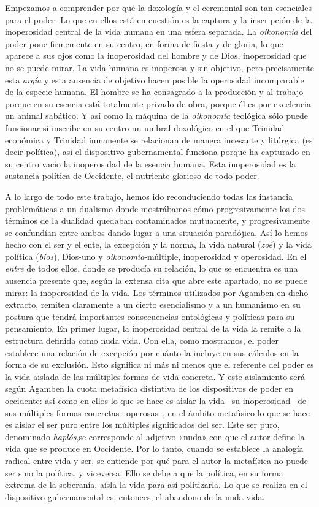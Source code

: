 Empezamos a comprender por qué la doxología y el ceremonial son tan esenciales para el poder. Lo que en ellos está en cuestión es la captura y la inscripción de la inoperosidad central de la vida humana en una esfera separada. La \emph{oikonomía }del poder pone firmemente en su centro, en forma de fiesta y de gloria, lo que aparece a sus ojos como la inoperosidad del hombre y de Dios, inoperosidad que no se puede mirar. La vida humana es inoperosa y sin objetivo, pero precisamente esta \emph{argía} y esta ausencia de objetivo hacen posible la operosidad incomparable de la especie humana. El hombre se ha consagrado a la producción y al trabajo porque en su esencia está totalmente privado de obra, porque él es por excelencia un animal sabático. Y así como la máquina de la \emph{oikonomía }teológica sólo puede funcionar si inscribe en su centro un umbral doxológico en el que Trinidad económica y Trinidad inmanente se relacionan de manera incesante y litúrgica (es decir política), así el dispositivo gubernamental funciona porque ha capturado en su centro vacío la inoperosidad de la esencia humana. Esta inoperosidad es la sustancia política de Occidente, el nutriente glorioso de todo poder.

A lo largo de todo este trabajo, hemos ido reconduciendo todas las instancia problemáticas a un dualismo donde mostrábamos cómo progresivamente los dos términos de la dualidad quedaban contaminados mutuamente, y progresivamente se confundían entre ambos dando lugar a una situación paradójica. Así lo hemos hecho con el ser y el ente, la excepción y la norma, la vida natural (\emph{zoé}) y la vida política (\emph{bíos}), Dios-uno y \emph{oikonomía}-múltiple, inoperosidad y operosidad. En el \emph{entre} de todos ellos, donde se producía su relación, lo que se encuentra es una ausencia presente que, según la extensa cita que abre este apartado, no se puede mirar: la inoperosidad de la vida. Los términos utilizados por Agamben en dicho extracto, remiten claramente a un cierto esencialismo y a un humanismo en su postura que tendrá importantes consecuencias ontológicas y políticas para su pensamiento. En primer lugar, la inoperosidad central de la vida la remite a la estructura definida como nuda vida. Con ella, como mostramos, el poder establece una relación de excepción por cuánto la incluye en sus cálculos en la forma de su exclusión. Esto significa ni más ni menos que el referente del poder es la vida aislada de las múltiples formas de vida concreta. Y este aislamiento será según Agamben la cuota metafísica distintiva de los dispositivos de poder en occidente: así como en ellos lo que se hace es aislar la vida --su inoperosidad-- de sus múltiples formas concretas --operosas--, en el ámbito metafísico lo que se hace es aislar el ser puro entre los múltiples significados del ser. Este ser puro, denominado \emph{haplós},se corresponde al adjetivo «nuda» con que el autor define la vida que se produce en Occidente. Por lo tanto, cuando se establece la analogía radical entre vida y ser, se entiende por qué para el autor la metafísica no puede ser sino la política, y viceversa. Ello se debe a que la política, en su forma extrema de la soberanía, aísla la vida para así politizarla. Lo que se realiza en el dispositivo gubernamental es, entonces, el abandono de la nuda vida.

